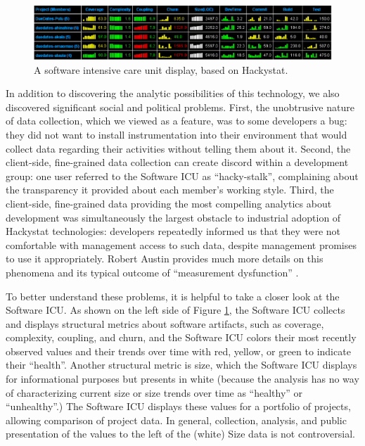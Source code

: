 \documentclass[]{article}
\begin{document}
\begin{figure}[!tb]
\centering
\includegraphics[width=1.0\columnwidth]{portfolio-2008.eps}
\caption{A software intensive care unit display, based on Hackystat.}
\label{fig:icu}
\end{figure}


In addition to discovering the analytic possibilities of this technology, we
also discovered significant social and political problems.  First, the unobtrusive nature of
data collection, which we viewed as a feature, was to some developers a bug: they did not
want to install instrumentation into their environment that would collect data regarding
their activities without telling them about it.  Second, the client-side, fine-grained
data collection can create discord within a development group: one
user referred to the Software ICU as ``hacky-stalk'', complaining about the
transparency it provided about each member's working style.  Third,
the client-side, fine-grained data providing the most compelling analytics about
development was simultaneously the largest obstacle to industrial adoption of Hackystat
technologies: developers repeatedly informed us that they were not comfortable with
management access to such data, despite management promises to use it appropriately. Robert
Austin provides much more details on this phenomena and its typical outcome of
``measurement dysfunction'' \cite{Austin96}.

To better understand these problems, it is helpful to take a closer look at the Software
ICU.  As shown on the left side of Figure \ref{fig:icu}, the Software ICU collects and
displays structural metrics about software artifacts, such as coverage, complexity,
coupling, and churn, and the Software ICU colors their most recently observed values and
their trends over time with red, yellow, or green to indicate their ``health''.  Another
structural metric is size, which the Software ICU displays for informational purposes but
presents in white (because the analysis has no way of characterizing current size or size
trends over time as ``healthy'' or ``unhealthy''.)  The Software ICU displays these values
for a portfolio of projects, allowing comparison of project data.  In general, collection,
analysis, and public presentation of the values to the left of the (white) Size data is
not controversial.
\end{document}
